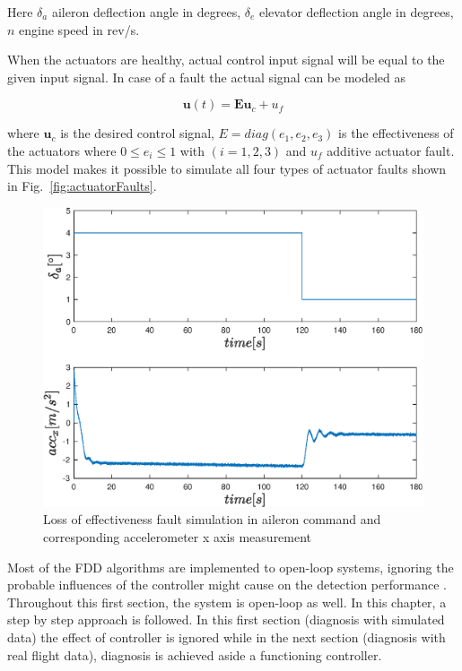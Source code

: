 Here $ \delta_{a}$ aileron deflection angle in degrees, $ \delta_{e}$ elevator deflection angle in degrees, $n$ engine speed in rev/s. 

When the actuators are healthy, actual control input signal will be equal to the given input signal. In case of a fault the actual signal can be modeled as

\begin{equation}
\bm{u}\left(t\right)= \bm{E}\bm{u}_c + u_f
\end{equation}

where $\bm{u}_c $ is the desired control signal, $E = diag(e_1, e_2, e_3)$ is the effectiveness of the actuators where $0 \leq e_i \leq 1 $ with $(i = 1, 2 ,3)$ and $u_f$ additive actuator fault. 
This model makes it possible to simulate all four types of actuator faults shown in Fig.~\ref{fig:actuatorFaults}.

\begin{figure}
\begin{center}
\includegraphics[width=12cm]{figures/control_input_acc_x}    %
\caption{Loss of effectiveness fault simulation in aileron command and corresponding accelerometer x axis measurement} 
\label{fig:faultSimulation}
\end{center}
\end{figure}

Most of the FDD algorithms are implemented to open-loop systems, ignoring the probable influences of the controller might cause on the detection performance \cite{pandita2013closed}. 
Throughout this first section, the system is open-loop as well.  
In this chapter, a step by step approach is followed. 
In this first section (diagnosis with simulated data) the effect of controller is ignored while in the next section (diagnosis with real flight data), diagnosis is achieved aside a functioning controller.

